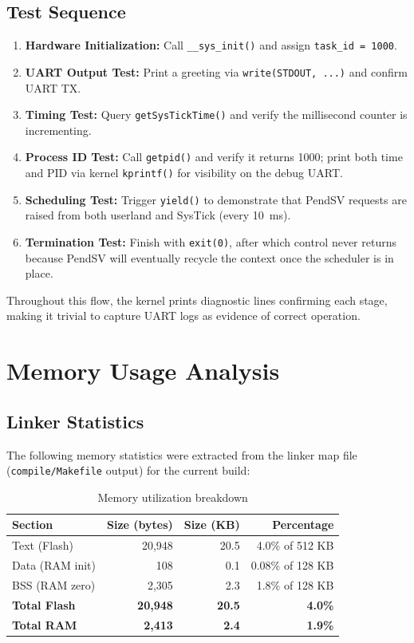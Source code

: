 \documentclass[11pt,a4paper]{article}
\begin{document}
\subsection{Test Sequence}
\begin{enumerate}[leftmargin=2em,label=\arabic*.]
  \item \textbf{Hardware Initialization:} Call \texttt{\_\_sys\_init()} and assign \texttt{task\_id = 1000}.
  \item \textbf{UART Output Test:} Print a greeting via \texttt{write(STDOUT, ...)} and confirm UART TX.
  \item \textbf{Timing Test:} Query \texttt{getSysTickTime()} and verify the millisecond counter is incrementing.
  \item \textbf{Process ID Test:} Call \texttt{getpid()} and verify it returns 1000; print both time and PID via kernel \texttt{kprintf()} for visibility on the debug UART.
  \item \textbf{Scheduling Test:} Trigger \texttt{yield()} to demonstrate that PendSV requests are raised from both userland and SysTick (every 10~ms).
  \item \textbf{Termination Test:} Finish with \texttt{exit(0)}, after which control never returns because PendSV will eventually recycle the context once the scheduler is in place.
\end{enumerate}

Throughout this flow, the kernel prints diagnostic lines confirming each stage, making it trivial to capture UART logs as evidence of correct operation.

\section{Memory Usage Analysis}

\subsection{Linker Statistics}
The following memory statistics were extracted from the linker map file (\texttt{compile/Makefile} output) for the current build:

\begin{table}[h]
\centering
\begin{tabular}{lrrr}
\toprule
\textbf{Section} & \textbf{Size (bytes)} & \textbf{Size (KB)} & \textbf{Percentage} \\
\midrule
Text (Flash) & 20,948 & 20.5 & 4.0\% of 512 KB \\
Data (RAM init) & 108 & 0.1 & 0.08\% of 128 KB \\
BSS (RAM zero) & 2,305 & 2.3 & 1.8\% of 128 KB \\
\midrule
\textbf{Total Flash} & \textbf{20,948} & \textbf{20.5} & \textbf{4.0\%} \\
\textbf{Total RAM} & \textbf{2,413} & \textbf{2.4} & \textbf{1.9\%} \\
\bottomrule
\end{tabular}
\caption{Memory utilization breakdown}
\label{tab:memory}
\end{table}
\end{document}
